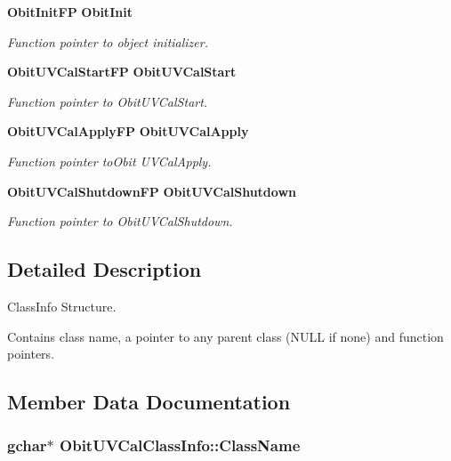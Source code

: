 \begin{CompactItemize}
{\bf Obit\-Init\-FP} {\bf Obit\-Init}
\begin{CompactList}\small\item\em Function pointer to object initializer. \item\end{CompactList}\item 
{\bf Obit\-UVCal\-Start\-FP} {\bf Obit\-UVCal\-Start}
\begin{CompactList}\small\item\em Function pointer to Obit\-UVCal\-Start. \item\end{CompactList}\item 
{\bf Obit\-UVCal\-Apply\-FP} {\bf Obit\-UVCal\-Apply}
\begin{CompactList}\small\item\em Function pointer to\-Obit UVCal\-Apply. \item\end{CompactList}\item 
{\bf Obit\-UVCal\-Shutdown\-FP} {\bf Obit\-UVCal\-Shutdown}
\begin{CompactList}\small\item\em Function pointer to Obit\-UVCal\-Shutdown. \item\end{CompactList}\end{CompactItemize}


\subsection{Detailed Description}
Class\-Info Structure. 

Contains class name, a pointer to any parent class (NULL if none) and function pointers. 



\subsection{Member Data Documentation}
\subsubsection{\setlength{\rightskip}{0pt plus 5cm}gchar$\ast$ {\bf Obit\-UVCal\-Class\-Info::Class\-Name}}\label{structObitUVCalClassInfo_o2}


